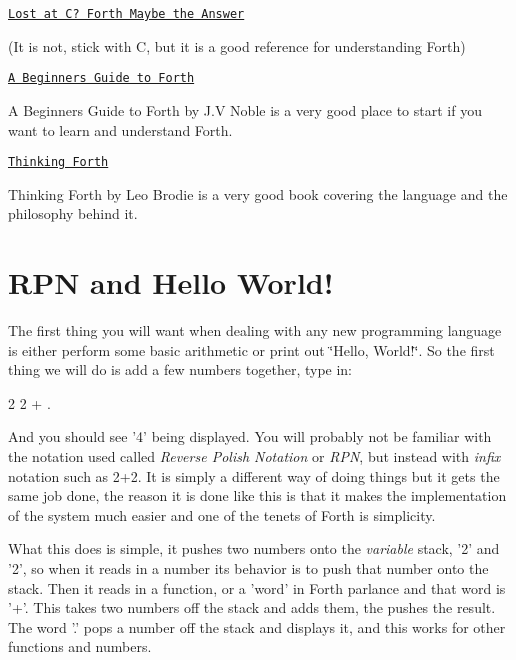 \begin{DoxyItemize}
\item \href{http://www.forth.org/lost-at-c.html}{\tt Lost at C? Forth Maybe the Answer}
\end{DoxyItemize}

(It is not, stick with C, but it is a good reference for understanding Forth)


\begin{DoxyItemize}
\item \href{http://galileo.phys.virginia.edu/classes/551.jvn.fall01/primer.htm}{\tt A Beginners Guide to Forth}
\end{DoxyItemize}

A Beginners Guide to Forth by J.\-V Noble is a very good place to start if you want to learn and understand Forth.


\begin{DoxyItemize}
\item \href{http://thinking-forth.sourceforge.net/}{\tt Thinking Forth}
\end{DoxyItemize}

Thinking Forth by Leo Brodie is a very good book covering the language and the philosophy behind it.

\section*{R\-P\-N and Hello World!}

The first thing you will want when dealing with any new programming language is either perform some basic arithmetic or print out \char`\"{}\-Hello, World!\char`\"{}. So the first thing we will do is add a few numbers together, type in\-:

\begin{DoxyVerb}2 2 + .\end{DoxyVerb}


And you should see '4' being displayed. You will probably not be familiar with the notation used called {\itshape Reverse Polish Notation} or {\itshape R\-P\-N}, but instead with {\itshape infix} notation such as 2+2. It is simply a different way of doing things but it gets the same job done, the reason it is done like this is that it makes the implementation of the system much easier and one of the tenets of Forth is simplicity.

What this does is simple, it pushes two numbers onto the {\itshape variable} stack, '2' and '2', so when it reads in a number its behavior is to push that number onto the stack. Then it reads in a function, or a 'word' in Forth parlance and that word is '+'. This takes two numbers off the stack and adds them, the pushes the result. The word '.' pops a number off the stack and displays it, and this works for other functions and numbers.

